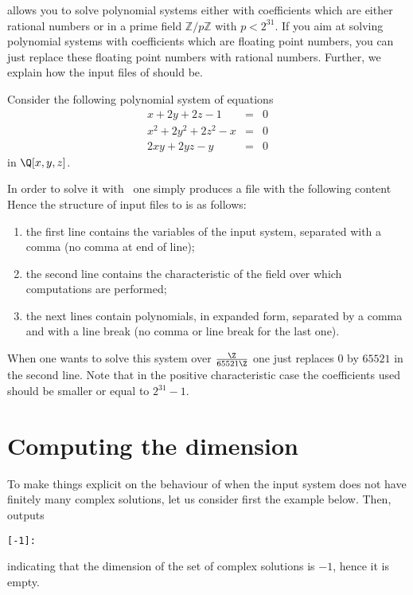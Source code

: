\documentclass[a4paper,english,11pt]{scrartcl}
\theoremstyle{definition}
\theoremstyle{remark}
\begin{document}
\msolve allows you to solve polynomial systems either with coefficients
which are either rational numbers or in a prime field $\mathbb{Z}/p\mathbb{Z}$
with $p < 2^{31}$. If you aim at solving polynomial systems with coefficients
which are floating point numbers, you can just replace these floating point
numbers with rational numbers. Further, we explain how the input files of
\msolve should be.

Consider the following polynomial system of equations
\[
  \begin{array}{rcl}
    x+2 y+2 z-1 &= &0\\
    x^2+2 y^2+2 z^2-x &= &0\\
    2 x y+2 y z-y &= &0
  \end{array}
\]
in $\Q[x,y,z]$.

In order to solve it with \msolve~one simply produces a file with the following content
Hence the structure of input files to \msolve is as follows:
\begin{enumerate}
\item the first line contains the variables of the input system, separated with
  a comma (no comma at end of line); 
\item the second line contains the characteristic of the field over which
  computations are performed; 
\item the next lines contain polynomials, in expanded form, separated by a comma
   and with a line break (no comma or line break for the last one).
\end{enumerate}



When one wants to solve this system over $\frac{\Z}{65521\Z}$ one just replaces
$0$ by $65521$ in the second line. Note that in the positive characteristic case
the coefficients used should be smaller or equal to $2^{31}-1$.


\section{Computing the dimension}\label{sec:dim}

To make things explicit on the behaviour of \msolve when the input system
does not have finitely many complex solutions, let us consider first the example
below.
Then, \msolve outputs
\begin{tcolorbox} %
  \begin{lstlisting}[basicstyle=\normalsize\ttfamily]
[-1]:
  \end{lstlisting}
\end{tcolorbox}
indicating that the dimension of the set of complex solutions is $-1$, hence it
is empty.
\end{document}
